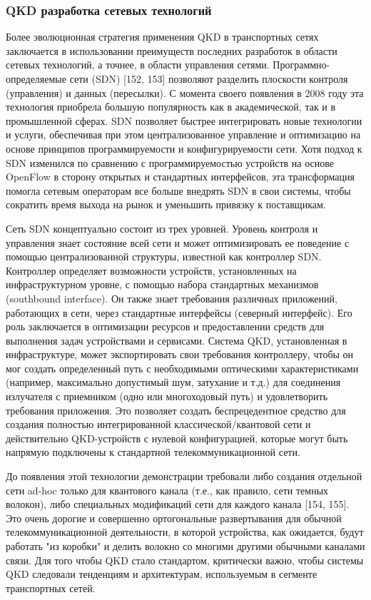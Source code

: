 \subsubsection{QKD разработка сетевых технологий}
Более эволюционная стратегия применения QKD в транспортных сетях заключается в использовании преимуществ последних разработок в области сетевых технологий, а точнее, в области управления сетями.
Программно-определяемые сети (SDN) [152, 153] позволяют разделить плоскости контроля (управления) и данных (пересылки). С момента своего появления в 2008 году эта технология приобрела большую популярность как в академической, так и в промышленной сферах. SDN позволяет быстрее интегрировать новые технологии и услуги, обеспечивая при этом централизованное управление и оптимизацию на основе принципов программируемости и конфигурируемости сети. Хотя подход к SDN изменился по сравнению с программируемостью устройств на основе OpenFlow в сторону открытых и стандартных интерфейсов, эта трансформация помогла сетевым операторам все больше внедрять SDN в свои системы, чтобы сократить время выхода на рынок и уменьшить привязку к поставщикам.

Сеть SDN концептуально состоит из трех уровней. Уровень контроля и управления знает состояние всей сети и может оптимизировать ее поведение с помощью централизованной структуры, известной как контроллер SDN. Контроллер определяет возможности устройств, установленных на инфраструктурном уровне, с помощью набора стандартных механизмов (southbound interface). Он также знает требования различных приложений, работающих в сети, через стандартные интерфейсы (северный интерфейс). Его роль заключается в оптимизации ресурсов и предоставлении средств для выполнения задач устройствами и сервисами. Система QKD, установленная в инфраструктуре, может экспортировать свои требования контроллеру, чтобы он мог создать определенный путь с необходимыми оптическими характеристиками (например, максимально допустимый шум, затухание и т.д.) для соединения излучателя с приемником (одно или многоходовый путь) и удовлетворить требования приложения. Это позволяет создать беспрецедентное средство для создания полностью интегрированной классической/квантовой сети и действительно QKD-устройств с нулевой конфигурацией, которые могут быть напрямую подключены к стандартной телекоммуникационной сети.

До появления этой технологии демонстрации требовали либо создания отдельной сети ad-hoc только для квантового канала (т.е., как правило, сети темных волокон), либо специальных модификаций сети для каждого канала [154, 155]. Это очень дорогие и совершенно ортогональные развертывания для обычной телекоммуникационной деятельности, в которой устройства, как ожидается, будут работать "из коробки" и делить волокно со многими другими обычными каналами связи. Для того чтобы QKD стало стандартом, критически важно, чтобы системы QKD следовали тенденциям и архитектурам, используемым в сегменте транспортных сетей.

